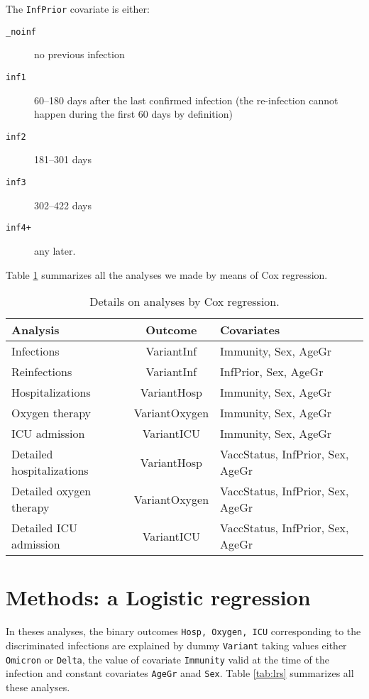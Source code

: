 \documentclass[9pt,onecolumn,twoside,lineno]{pnas-new}
\begin{document}
The {\tt InfPrior} covariate is either: 
\begin{description}
\item[{\tt \_noinf}] no previous infection
\item[{\tt inf1}] 60--180 days after the last confirmed infection (the re-infection cannot happen during the first 60 days by definition)
\item[{\tt inf2}] 181--301 days 
\item[{\tt inf3}] 302--422 days 
\item[{\tt inf4+}] any later.
\end{description}

\bigskip

Table \ref{tab:anals} summarizes all the analyses we made by means of Cox regression. 

\begin{table}
\caption{Details on analyses by Cox regression. \vspace{1mm}}
\centering
\begin{tabular}{lcl}
\hline
Analysis & Outcome & Covariates \\ \hline
Infections   & VariantInf & 
Immunity, Sex, AgeGr \\
Reinfections & VariantInf & InfPrior, Sex, AgeGr \\
Hospitalizations &  VariantHosp & Immunity, Sex, AgeGr \\
Oxygen therapy &  VariantOxygen & Immunity, Sex, AgeGr \\
ICU admission & VariantICU & Immunity, Sex, AgeGr \\
Detailed hospitalizations &  VariantHosp & VaccStatus, InfPrior, Sex, AgeGr \\
Detailed oxygen therapy &  VariantOxygen & VaccStatus, InfPrior, Sex, AgeGr \\
Detailed ICU admission & VariantICU & VaccStatus, InfPrior, Sex, AgeGr \\
\hline
\end{tabular}
\label{tab:anals}
\end{table}


\section*{Methods: a Logistic regression}

In theses analyses, the binary outcomes {\tt Hosp, Oxygen, ICU} corresponding to the discriminated infections are explained by dummy {\tt Variant} taking values either {\tt Omicron} or {\tt Delta}, the value of covariate {\tt Immunity} valid at the time of the infection and constant covariates {\tt AgeGr} anad {\tt Sex}. Table \ref{tab:lrs} summarizes all these analyses.
\end{document}
